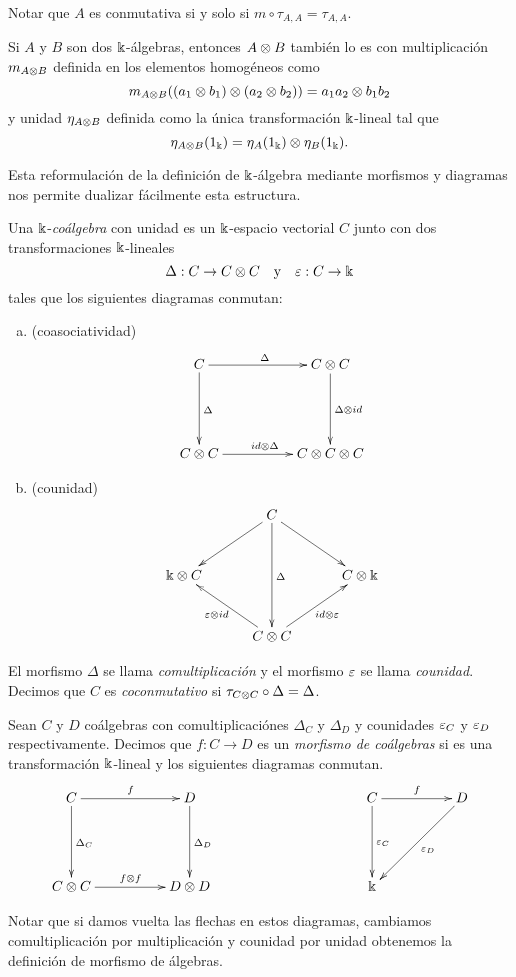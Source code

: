 \documentclass[a4paper,oneside,fleqn,11pt,../tesis.tex]{subfiles}
\begin{document}
Notar que $A$ es conmutativa si y solo si $m \circ \tau_{A, A} = \tau_{A, A}$.
\begin{obs}
	Si $A$ y $B$ son dos $\Bbbk$-álgebras, entonces $A \otimes B$
	también lo es con multiplicación $m_{A \otimes B}$ definida en los elementos homogéneos como
	\[
		m_{A \otimes B} ((a_1 \otimes b_1) \otimes (a_2 \otimes b_2)) = a_1 a_2 \otimes b_1 b_2
	\]
	y unidad $\eta_{A \otimes B}$ definida como la única transformación $\Bbbk$-lineal tal que
	\[
		\eta_{A \otimes B}(1_{\Bbbk}) = \eta_A(1_{\Bbbk}) \otimes \eta_B(1_{\Bbbk}).
	\]
\end{obs}

Esta reformulación de la definición de $\Bbbk$-álgebra mediante morfismos y diagramas nos permite dualizar fácilmente esta estructura.

\begin{definition}\label{defcoalgebra}
	Una $\Bbbk$-\emph{coálgebra} con unidad es un $\Bbbk$-espacio vectorial $C$
	junto con dos transformaciones $\Bbbk$-lineales
	\[
		\Delta: C \to C \otimes C \quad\text{y}\quad \varepsilon: C \to \Bbbk
	\]
	tales que los siguientes diagramas conmutan:
	\begin{enumerate}[(a)]
		\item (coasociatividad)
		\begin{align*}
		\xymatrix@=5em{
			C \ar[r]^{\Delta} \ar[d]^{\Delta} & C \ox C \ar[d]^{\Delta \ox id}\\
			C \ox C \ar[r]^{id \ox \Delta} & C \ox C \ox C
		}
		\end{align*}
		\item (counidad)
		\begin{align*}
		\xymatrix@=3em{
			& C \ar[dd]^{\Delta} \ar[dl] \ar[dr] & \\
			\field \ox C  & & C \ox \field \\
			& C \ox C \ar[ul]^{\veps \ox id} \ar[ur]_{id \ox \veps} &
		}
		\end{align*}
	\end{enumerate}
	El morfismo $\Delta$ se llama \emph{comultiplicación} y el morfismo $\varepsilon$ se llama \emph{counidad}.
	Decimos que $C$ es \emph{coconmutativo} si $\tau_{C \otimes C} \circ \Delta = \Delta$.
\end{definition}

\begin{definition} \label{defmorfcoalegbras}
	Sean $C$ y $D$ coálgebras con comultiplicaciónes $\Delta_C$ y $\Delta_D$ y counidades $\varepsilon_C$ y $\varepsilon_D$ respectivamente.
	Decimos que $f:C \to D$ es un \emph{morfismo de coálgebras} si es una transformación $\Bbbk$-lineal y los siguientes diagramas
	conmutan.
	\begin{align*}
	\xymatrix@=5em{
		C \ar[r]^{f} \ar[d]^{\Delta_C} & D \ar[d]^{\Delta_D} && C \ar[r]^{f} \ar[d]^{\veps_C} & D \ar[dl]^{\veps_D} \\
		C \ox C \ar[r]^{f \ox f} & D\ox D && \field	
	}
	\end{align*}
\end{definition}
Notar que si damos vuelta las flechas en estos diagramas, cambiamos comultiplicación por multiplicación y counidad
por unidad obtenemos la definición de morfismo de álgebras.
\end{document}
